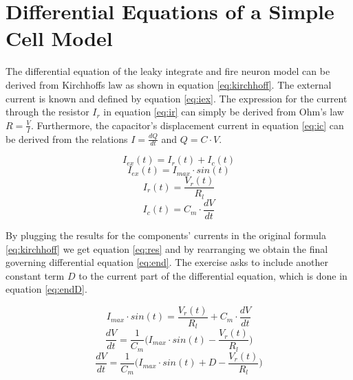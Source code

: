 \documentclass{scrartcl}
\begin{document}
\newpage

\section{Differential Equations of a Simple Cell Model}

The differential equation of the leaky integrate and fire neuron model can be derived from Kirchhoffs law as shown in equation \ref{eq:kirchhoff}. The external current is known and defined by equation \ref{eq:iex}. The expression for the current through the resistor $I_{r}$ in equation \ref{eq:ir} can simply be derived from Ohm's law $R = \frac{V}{I}$. Furthermore, the capacitor's displacement current in equation \ref{eq:ic} can be derived from the relations $I = \frac{dQ}{dt}$ and $Q = C \cdot V$. 

\begin{equation}
	\label{eq:kirchhoff}
	I_{ex}(t) = I_{r}(t) + I_{c}(t)
\end{equation}
\begin{equation}
	\label{eq:iex}
	I_{ex}(t) = I_{max} \cdot sin(t) 
\end{equation}
\begin{equation}
	\label{eq:ir}
	I_{r}(t) = \frac{V_{r}(t)}{R_{l}}  
\end{equation}
\begin{equation}
	\label{eq:ic}
	I_{c}(t) = C_{m} \cdot \frac{dV}{dt}  
\end{equation}

By plugging the results for the components' currents in the original formula \ref{eq:kirchhoff} we get equation \ref{eq:res} and by rearranging we obtain the final governing differential equation \ref{eq:end}. The exercise asks to include another constant term $D$ to the current part of the differential equation, which is done in equation \ref{eq:endD}.

\begin{equation}
	\label{eq:res}
	I_{max} \cdot sin(t) = \frac{V_{r}(t)}{R_{l}} + C_{m} \cdot \frac{dV}{dt}
\end{equation}
\begin{equation}
	\label{eq:end}
	\frac{dV}{dt} = \frac{1}{C_{m}}\bigg( I_{max}\cdot sin(t) - \frac{V_{r}(t)}{R_{l}}\bigg)
\end{equation}
\begin{equation}
	\label{eq:endD}
	\frac{dV}{dt} = \frac{1}{C_{m}}\bigg( I_{max}\cdot sin(t) + D - \frac{V_{r}(t)}{R_{l}}\bigg)
\end{equation}
\end{document}
